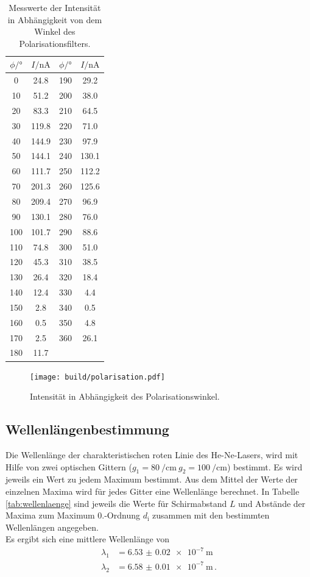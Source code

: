 \begin{table}
  \centering
  \caption{Messwerte der Intensität in Abhängigkeit von dem Winkel des Polarisationsfilters.}
  \label{tab:polarisation}
  \begin{tabular}{c c | c c}
\toprule
    $\phi / \si{\degree}$ & $I/\si{\nano\ampere}$ & $\phi / \si{\degree}$ & $I/\si{\nano\ampere}$\\
\midrule
0	&	24.8   & 190	&	29.2 \\
10	&	51.2 &  200	&	38.0  \\
20	&	83.3 &  210	&	64.5  \\
30	&	119.8&  220	&	71.0   \\
40	&	144.9&  230	&	97.9   \\
50	&	144.1&  240	&	130.1  \\
60	&	111.7&  250	&	112.2  \\
70	&	201.3&  260	&	125.6  \\
80	&	209.4& 270	&	96.9    \\
90	&	130.1& 280	&	76.0    \\
100	&	101.7& 290	&	88.6    \\
110	&	74.8 & 300	&	51.0   \\
120	&	45.3 & 310	&	38.5   \\
130	&	26.4 & 320	&	18.4   \\
140	&	12.4 & 330	&	4.4    \\
150	&	2.8  & 340	&	0.5   \\
160	&	0.5  & 350	&	4.8   \\
170	&	2.5  & 360	&	26.1  \\
180	&	11.7 &  &  \\
\bottomrule
\end{tabular}
\end{table}


\begin{figure}
  \centering
  \texttt{[image: build/polarisation.pdf]}
  \caption{Intensität in Abhängigkeit des Polarisationswinkel.}
  \label{fig:polarisation}
\end{figure}




\subsection{Wellenlängenbestimmung}
\label{subsec:wellenlaenge}

Die Wellenlänge der charakteristischen roten Linie des He-Ne-Lasers, wird mit Hilfe
von zwei optischen Gittern ($g_{1} = \SI{80}{\per\centi\meter} \ g_{2} = \SI{100}{\per\centi\meter}$) bestimmt.
Es wird jeweils ein Wert zu jedem Maximum bestimmt. Aus dem Mittel der Werte der einzelnen Maxima
wird für jedes Gitter eine Wellenlänge berechnet.
In Tabelle \ref{tab:wellenlaenge} sind jeweils die Werte für Schirmabstand $L$ und Abstände der Maxima
zum Maximum $0.$-Ordnung $d_{\text{i}}$ zusammen mit den bestimmten Wellenlängen angegeben.\\
Es ergibt sich eine mittlere Wellenlänge von
\begin{align*}
  \lambda_{1} &= \SI{6.53(2) e-7}{\meter}\\
  \lambda_{2} &= \SI{6.58(1) e-7}{\meter} \, .
\end{align*}


